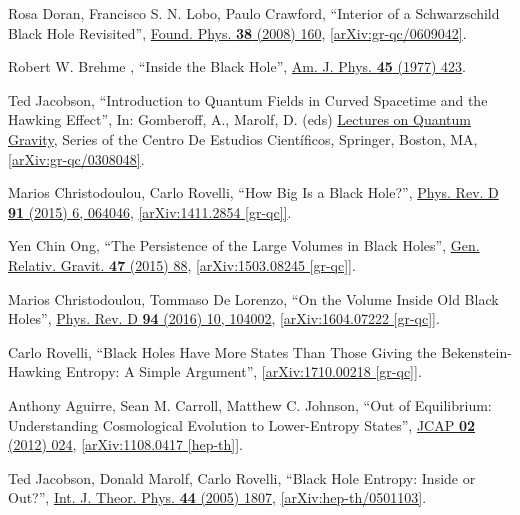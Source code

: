 \documentclass[12pt,preprintnumbers, floatfix, preprintnumbers, letterpaper, superscriptaddress,nofootinbib]{revtex4-2}
\begin{document}
\begin{thebibliography}{99}
Rosa Doran, Francisco S. N. Lobo, Paulo Crawford, ``Interior of a Schwarzschild Black Hole Revisited'', {\href{https://link.springer.com/article/10.1007/s10701-007-9197-6}{Found. Phys. \textbf{38} (2008) 160}}, \href{https://arxiv.org/abs/gr-qc/0609042}{[arXiv:gr-qc/0609042]}.

Robert W. Brehme , ``Inside the Black Hole'', {\href{https://pubs.aip.org/aapt/ajp/article-abstract/45/5/423/1050671/Inside-the-black-hole?redirectedFrom=fulltext}{Am. J. Phys. \textbf{45} (1977) 423}}.

Ted Jacobson, ``Introduction to Quantum Fields in Curved Spacetime and the Hawking Effect'', In: Gomberoff, A., Marolf, D. (eds) {\href{https://doi.org/10.1007/0-387-24992-3_2}{Lectures on Quantum Gravity}}, Series of the Centro De Estudios Científicos, Springer, Boston, MA, \href{https://arxiv.org/abs/gr-qc/0308048}{[arXiv:gr-qc/0308048]}.

Marios Christodoulou, Carlo Rovelli, ``How Big Is a Black Hole?'', {\href{https://journals.aps.org/prd/abstract/10.1103/PhysRevD.91.064046}{Phys. Rev. D \textbf{91} (2015) 6, 064046}}, \href{https://arxiv.org/abs/1411.2854}{[arXiv:1411.2854 [gr-qc]]}.


Yen Chin Ong, ``The Persistence of the Large Volumes in Black Holes'', {\href{https://link.springer.com/article/10.1007/s10714-015-1929-x}{Gen. Relativ. Gravit. \textbf{47} (2015) 88}}, \href{https://arxiv.org/abs/1503.08245}{[arXiv:1503.08245 [gr-qc]]}.

Marios Christodoulou, Tommaso De Lorenzo, ``On the Volume Inside Old Black Holes'', {\href{https://journals.aps.org/prd/abstract/10.1103/PhysRevD.94.104002}{Phys. Rev. D \textbf{94} (2016) 10, 104002}}, \href{https://arxiv.org/abs/1604.07222}{[arXiv:1604.07222 [gr-qc]]}.

Carlo Rovelli, ``Black Holes Have More States Than Those Giving the Bekenstein-Hawking Entropy: A Simple Argument'', \href{https://arxiv.org/abs/1710.00218}{[arXiv:1710.00218 [gr-qc]]}.


Anthony Aguirre, Sean M. Carroll, Matthew C. Johnson, ``Out of Equilibrium: Understanding Cosmological Evolution to Lower-Entropy States'', {\href{https://iopscience.iop.org/article/10.1088/1475-7516/2012/02/024}{JCAP \textbf{02} (2012) 024}}, \href{https://arxiv.org/abs/1108.0417}{[arXiv:1108.0417 [hep-th]]}.


Ted Jacobson, Donald Marolf, Carlo Rovelli, ``Black Hole Entropy: Inside or Out?'', 	{\href{https://link.springer.com/article/10.1007/s10773-005-8896-z}{Int. J. Theor. Phys. \textbf{44} (2005) 1807}}, \href{https://arxiv.org/abs/hep-th/0501103}{[arXiv:hep-th/0501103]}.


\end{thebibliography}
\end{document}
